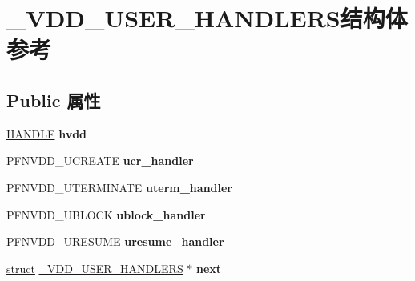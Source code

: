 \hypertarget{struct___v_d_d___u_s_e_r___h_a_n_d_l_e_r_s}{}\section{\+\_\+\+V\+D\+D\+\_\+\+U\+S\+E\+R\+\_\+\+H\+A\+N\+D\+L\+E\+R\+S结构体 参考}
\label{struct___v_d_d___u_s_e_r___h_a_n_d_l_e_r_s}
\subsection*{Public 属性}
\begin{DoxyCompactItemize}
\item 
\mbox{\label{struct___v_d_d___u_s_e_r___h_a_n_d_l_e_r_s_a802db615bc65150928f9528ad8dc697a}} 
\hyperlink{interfacevoid}{H\+A\+N\+D\+LE} {\bfseries hvdd}
\item 
\mbox{\label{struct___v_d_d___u_s_e_r___h_a_n_d_l_e_r_s_ab11e9346d1e14686d6870645fe059d5d}} 
P\+F\+N\+V\+D\+D\+\_\+\+U\+C\+R\+E\+A\+TE {\bfseries ucr\+\_\+handler}
\item 
\mbox{\label{struct___v_d_d___u_s_e_r___h_a_n_d_l_e_r_s_ab970ddd72caaf3ee4127a4e4617e5022}} 
P\+F\+N\+V\+D\+D\+\_\+\+U\+T\+E\+R\+M\+I\+N\+A\+TE {\bfseries uterm\+\_\+handler}
\item 
\mbox{\label{struct___v_d_d___u_s_e_r___h_a_n_d_l_e_r_s_ae37fad4434ccdbfb6d929659c74b3a8f}} 
P\+F\+N\+V\+D\+D\+\_\+\+U\+B\+L\+O\+CK {\bfseries ublock\+\_\+handler}
\item 
\mbox{\label{struct___v_d_d___u_s_e_r___h_a_n_d_l_e_r_s_a3ad9d31ec082149c3e4f5c8b7d01a92e}} 
P\+F\+N\+V\+D\+D\+\_\+\+U\+R\+E\+S\+U\+ME {\bfseries uresume\+\_\+handler}
\item 
\mbox{\label{struct___v_d_d___u_s_e_r___h_a_n_d_l_e_r_s_a1d3029ff1857c110f6db9fde00fdf0b2}} 
\hyperlink{interfacestruct}{struct} \hyperlink{struct___v_d_d___u_s_e_r___h_a_n_d_l_e_r_s}{\+\_\+\+V\+D\+D\+\_\+\+U\+S\+E\+R\+\_\+\+H\+A\+N\+D\+L\+E\+RS} $\ast$ {\bfseries next}

\end{DoxyCompactItemize}
